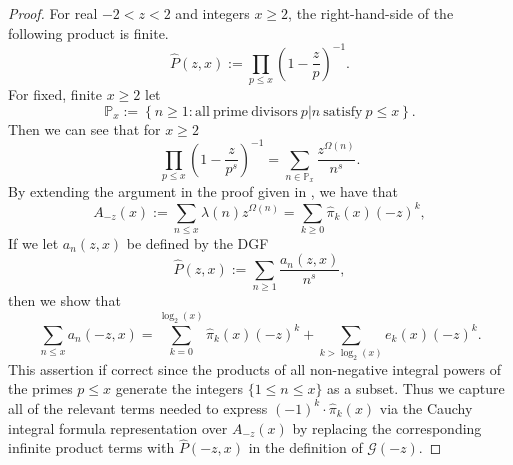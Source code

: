 \documentclass[11pt,reqno,a4letter]{article}
\numberwithin{figure}{section}
\numberwithin{table}{section}
\theoremstyle{plain}
\numberwithin{theorem}{section}
\theoremstyle{definition}
\begin{document}
\begin{proof}
\label{proofOf_theorem_GFs_SymmFuncs_SumsOfRecipOfPowsOfPrimes} 
For real $-2 < z < 2$ and integers $x \geq 2$, 
the right-hand-side of the following product is finite. 
\[
\widehat{P}(z, x) := \prod_{p \leq x} \left(1 - \frac{z}{p}\right)^{-1}. 
\]
For fixed, finite $x \geq 2$ let 
\[
\mathbb{P}_x := \left\{n \geq 1: \mathrm{ all\ prime\ divisors\ } 
     p|n \mathrm{\ satisfy\ } p \leq x\right\}. 
\]
Then we can see that for $x \geq 2$ 
\begin{equation} 
\label{eqn_proof_tag_PHatFiniteTruncProdFactorOfGz_v2} 
\prod_{p \leq x} \left(1 - \frac{z}{p^s}\right)^{-1} = \sum_{n \in \mathbb{P}_x} 
     \frac{z^{\Omega(n)}}{n^s}. 
\end{equation} 
By extending the argument in the proof given in 
\cite[\S 7.4]{MV}, we have that 
\[
A_{-z}(x) := \sum_{n \leq x} \lambda(n) z^{\Omega(n)} = 
     \sum_{k \geq 0} \widehat{\pi}_k(x) (-z)^k, 
\] 
If we let $a_n(z, x)$ be defined by the DGF 
\[
\widehat{P}(z, x) := \sum_{n \geq 1} \frac{a_n(z, x)}{n^s}, 
\]
then we show that 
\[
\sum_{n \leq x} a_n(-z, x) = 
     \sum_{k=0}^{\log_2(x)} \widehat{\pi}_k(x) (-z)^k + 
     \sum_{k > \log_2(x)} e_k(x) (-z)^{k}. 
\]
This assertion if correct since the products of all non-negative integral powers of the 
primes $p \leq x$ generate the integers $\{1 \leq n \leq x\}$ as a subset. 
Thus we capture all of the relevant terms needed to express 
$(-1)^{k} \cdot \widehat{\pi}_k(x)$ 
via the Cauchy integral formula representation over $A_{-z}(x)$ by 
replacing the corresponding infinite product terms with 
$\widehat{P}(-z, x)$ in the definition of $\mathcal{G}(-z)$. 


\end{proof}
\end{document}
